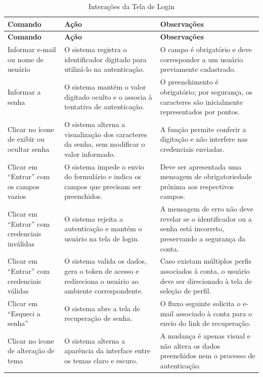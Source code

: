 \begin{longtable}{|L{4.1cm}|L{5.2cm}|L{5.2cm}|}
\caption{Interações da Tela de Login}
\label{tab:interacoes-login} \\
\hline
\textbf{Comando} & \textbf{Ação} & \textbf{Observações} \\
\hline
\endfirsthead
\hline
\textbf{Comando} & \textbf{Ação} & \textbf{Observações} \\
\hline
\endhead
Informar e-mail ou nome de usuário & O sistema registra o identificador digitado para utilizá-lo na autenticação. & O campo é obrigatório e deve corresponder a um usuário previamente cadastrado. \\
\hline
Informar a senha & O sistema mantém o valor digitado oculto e o associa à tentativa de autenticação. & O preenchimento é obrigatório; por segurança, os caracteres são inicialmente representados por pontos. \\
\hline
Clicar no ícone de exibir ou ocultar senha & O sistema alterna a visualização dos caracteres da senha, sem modificar o valor informado. & A função permite conferir a digitação e não interfere nas credenciais enviadas. \\
\hline
Clicar em ``Entrar'' com os campos vazios & O sistema impede o envio do formulário e indica os campos que precisam ser preenchidos. & Deve ser apresentada uma mensagem de obrigatoriedade próxima aos respectivos campos. \\
\hline
Clicar em ``Entrar'' com credenciais inválidas & O sistema rejeita a autenticação e mantém o usuário na tela de login. & A mensagem de erro não deve revelar se o identificador ou a senha está incorreto, preservando a segurança da conta. \\
\hline
Clicar em ``Entrar'' com credenciais válidas & O sistema valida os dados, gera o token de acesso e redireciona o usuário ao ambiente correspondente. & Caso existam múltiplos perfis associados à conta, o usuário deve ser direcionado à tela de seleção de perfil. \\
\hline
Clicar em ``Esqueci a senha'' & O sistema abre a tela de recuperação de senha. & O fluxo seguinte solicita o e-mail associado à conta para o envio do link de recuperação. \\
\hline
Clicar no ícone de alteração de tema & O sistema alterna a aparência da interface entre os temas claro e escuro. & A mudança é apenas visual e não altera os dados preenchidos nem o processo de autenticação. \\
\hline
\end{longtable}

